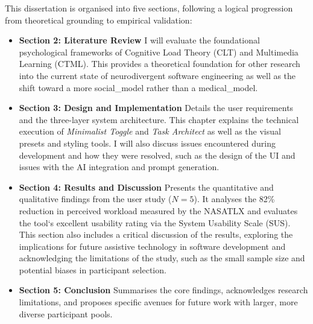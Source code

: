 This dissertation is organised into five sections, following a logical progression from theoretical grounding to empirical validation:
\begin{itemize}
  \item \textbf{Section 2: Literature Review} I will evaluate the foundational psychological frameworks of Cognitive Load Theory (CLT) and Multimedia Learning (CTML). This provides a theoretical foundation for other research into the current state of \gls{neurodivergent} 
  software engineering as well as the shift toward a more \gls{social_model} rather than a \gls{medical_model}.
  \item \textbf{Section 3: Design and Implementation} Details the user requirements and the three-layer system architecture. This chapter explains the technical
   execution of \textit{Minimalist Toggle} and \textit{Task Architect} as well as the visual presets and styling tools. I will also discuss issues encountered during development and how they were resolved, such as the design of the UI and issues with the \gls{AI} integration and prompt generation.
  \item \textbf{Section 4: Results and Discussion} Presents the quantitative and qualitative findings from the user study ($N=5$). It analyses the 82\% reduction in perceived workload measured by the \gls{NASATLX} 
  and evaluates the tool`s excellent usability rating via the System Usability Scale (SUS). This section also includes a critical discussion of the results, exploring the implications for future assistive 
  technology in software development and acknowledging the limitations of the study, such as the small sample size and potential biases in participant selection.
  \item \textbf{Section 5: Conclusion} Summarises the core findings, acknowledges research limitations, and proposes specific avenues for future work with larger, more diverse participant pools.
\end{itemize}

\newpage